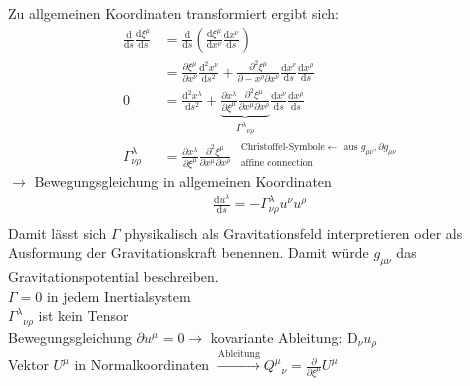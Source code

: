 \documentclass[a4paper]{article}
\begin{document}
Zu allgemeinen Koordinaten transformiert ergibt sich:
\begin{align}
\frac{\mathrm{d}}{\mathrm{d}s}\frac{\mathrm{d}\xi^\mu}{\mathrm{d}s}&=
\frac{\mathrm{d}}{\mathrm{d}s}\left( \frac{\mathrm{d}\xi^\mu}{\mathrm{d}x^\nu}
\frac{\mathrm{d}x^\nu}{\mathrm{d}s} \right)\\
&=\frac{\partial \xi^\mu}{\partial x^\nu}
\frac{\mathrm{d}^2x^\nu}{\mathrm{d}s^2}+\frac{\partial^2 \xi^\mu}{\partial-
x^\rho \partial x^\nu}
\frac{\mathrm{d}x^\nu}{\mathrm{d}s} \frac{\mathrm{d}x^\rho}{\mathrm{d}s}\\
0&=\frac{\mathrm{d}^2x^\lambda}{\mathrm{d}s^2}+\underbrace{\frac{\partial
x^\lambda}{\partial \xi^\mu}\frac{\partial^2 \xi^\mu}{\partial x^\mu
\partial x^\rho}}_{\Gamma^\lambda{}_{\nu\rho}}
\frac{\mathrm{d}x^\nu}{\mathrm{d}s} \frac{\mathrm{d}x^\rho}{\mathrm{d}s}\\
\Gamma^\lambda_{\nu\rho}&=\frac{\partial
x^\lambda}{\partial \xi^\mu}\frac{\partial^2 \xi^\mu}{\partial x^\mu
\partial x^\rho} \ \ \ {}^{\text{Christoffel-Symbole}\leftarrow
\text{ aus } g_{\mu\nu},\partial g_{\mu\nu}}_{\text{affine connection}}
\end{align}
$\rightarrow$ Bewegungsgleichung in allgemeinen Koordinaten
\begin{align}
\frac{\mathrm{d} u^\lambda}{\mathrm{d}s}=-\Gamma^\lambda_{\nu\rho}u^\nu u^\rho\\
\end{align}
Damit lässt sich $\Gamma$ physikalisch als Gravitationsfeld interpretieren oder
als Ausformung der Gravitationskraft benennen. Damit würde $g_{\mu\nu}$ das
Gravitationspotential beschreiben.\\
$\Gamma=0$ in jedem Inertialsystem\\
$\Gamma^\lambda{}_{\nu\rho}$ ist kein Tensor\\
Bewegungsgleichung $\partial u^\mu=0 \longrightarrow$ kovariante Ableitung:
$\mathrm{D}_\nu u_\rho$\\
Vektor $U^\mu$ in Normalkoordinaten
$\overset{\text{Ableitung}}{\longrightarrow}
Q^\mu{}_\nu=\frac{\partial}{\partial \xi^\mu} U^\mu$\\
\end{document}
